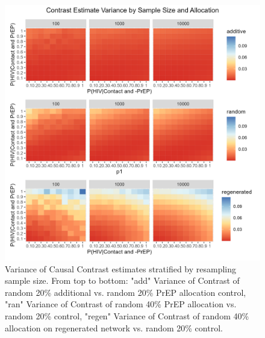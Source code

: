 \documentclass{article}
\theoremstyle{definition}
\begin{document}
\begin{figure}[H]
    \centering
    \includegraphics[scale=0.8]{Figures/Sample Size Variance plots.png}
    \caption{Variance of Causal Contrast estimates stratified by resampling sample size. From top to bottom: "add" Variance of Contrast of random 20\% additional vs. random 20\% PrEP allocation control, "ran" Variance of Contrast of random 40\% PrEP allocation vs. random 20\% control, "regen" Variance of Contrast of random 40\% allocation on regenerated network vs. random 20\% control.}
    \label{fig:Figure 10}
\end{figure}
\end{document}
